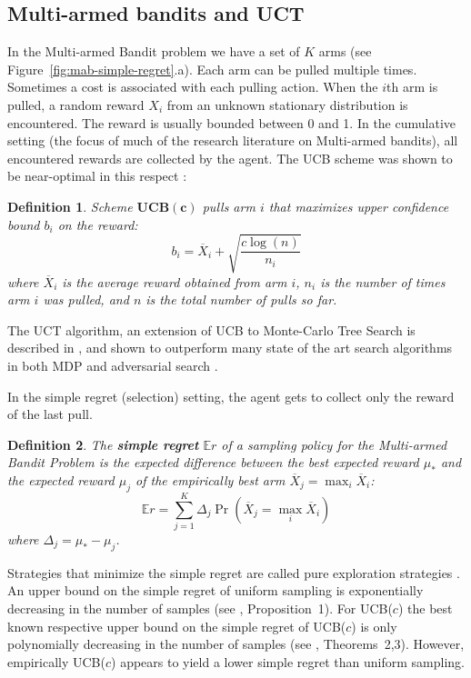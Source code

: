 \documentclass[letterpaper]{article}
\newcommand {\IE} {\ensuremath {\mathbb{E}}}
\newtheorem{dfn}{Definition}
\begin{document}
\subsection{Multi-armed bandits and UCT}

In the Multi-armed Bandit problem \cite{Vermorel.bandits} we have a set
of $K$ arms (see Figure~\ref{fig:mab-simple-regret}.a). Each arm can
be pulled multiple times. Sometimes a cost is
associated with each pulling action. When the $i$th arm
is pulled, a random reward $X_i$ from an unknown stationary
distribution is encountered.  The reward is usually bounded between 0 and 1.
In the cumulative setting (the focus of much of the research literature on Multi-armed bandits),
all encountered rewards are collected by the agent. 
The UCB scheme was shown to be near-optimal in this respect \cite{Auer.ucb}:

\begin{dfn} Scheme $\mathbf{UCB(c)}$ pulls arm $i$ that maximizes 
upper confidence bound $b_i$ on the reward:
\begin{equation}
b_i=\overline X_i+\sqrt {\frac {c \log (n)} {n_i}}
\label{eqn:ucb}
\end{equation}
where $\overline X_i$ is the average reward obtained from arm $i$,
$n_i$ is the number of times arm $i$ was pulled, and $n$ is the total
number of pulls so far. \end{dfn} 

The UCT algorithm, an extension of UCB
to Monte-Carlo Tree Search is described in \cite{Kocsis.uct}, and
shown to outperform many state of the art search algorithms in both
MDP and adversarial search \cite{Eyerich.ctp}. 

In the simple regret (selection) setting, the agent gets to
collect only the reward of the last pull.

\begin{dfn}
The \textbf{simple regret} $\IE r$ of a sampling policy for the Multi-armed Bandit
Problem is the expected difference between the best expected reward
$\mu_*$ and the expected reward $\mu_j$ of the empirically best arm
$\overline X_j=\max_i\overline X_i$:
\begin{equation}
\IE r=\sum_{j=1}^K\Delta_j\Pr(\overline X_j=\max_i\overline X_i)
\label{eqn:simple-regret}
\end{equation}
where $\Delta_j=\mu_*-\mu_j$.
\end{dfn}

Strategies that minimize the simple regret are called pure exploration
strategies \cite{Bubeck.pure}. An upper bound on the simple regret of uniform sampling is
exponentially decreasing in the number of samples (see
\cite{Bubeck.pure}, Proposition~1). For UCB($c$) the best known respective upper bound on the simple
regret of UCB($c$) is only polynomially decreasing in the number of samples
(see \cite{Bubeck.pure}, Theorems~2,3). However, empirically
UCB($c$) appears to yield a lower simple regret than uniform
sampling. 
\end{document}
